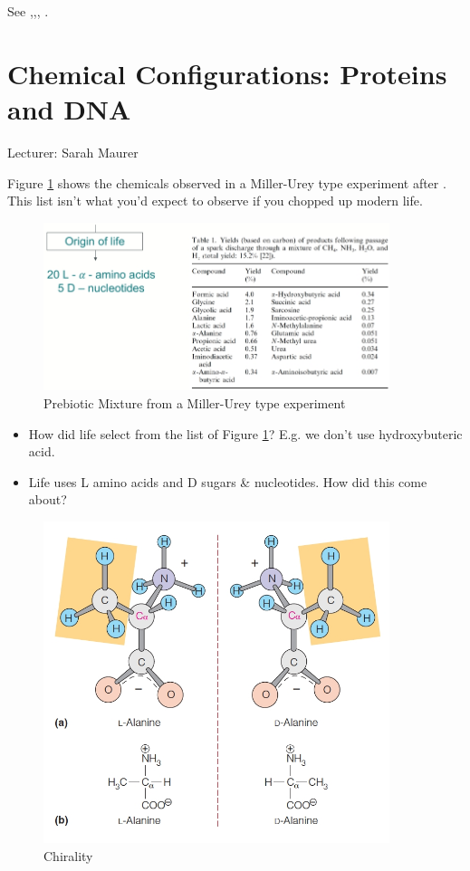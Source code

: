 \documentclass[]{article}
\begin{document}
See \cite{pross2017and},\cite{semenov2016autocatalytic},\cite{pross2008can}, \cite{pross2005emergence}.

\section{Chemical Configurations: Proteins and DNA}

Lecturer: Sarah Maurer

Figure \ref{fig:PrebioticMix} shows the chemicals observed in a Miller-Urey type experiment after \cite{podlech2001origin}. This list isn't what you'd expect to observe if you chopped up modern life.
\begin{figure}[H]
	\caption{Prebiotic Mixture from a Miller-Urey type experiment} \label{fig:PrebioticMix} 
	\includegraphics[width=0.9\textwidth]{PrebioticMix}
\end{figure}

\begin{itemize}
	\item How did life select from the list of Figure \ref{fig:PrebioticMix}? E.g. we don't use hydroxybuteric acid.
	\item Life uses L amino acids and D sugars \& nucleotides. How did this come about?
\end{itemize}

\begin{figure}[H]
	\caption{Chirality} \label{fig:Chirality1} 
	\includegraphics[width=0.9\textwidth]{Chirality1}
\end{figure}
\end{document}
